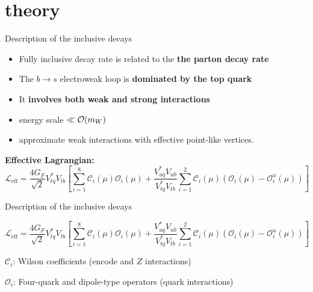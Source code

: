 \documentclass[xcolor=dvipsnames]{beamer}
\begin{document}
\section{\safeBtoXsdgamma theory}

\begin{frame}{Description of the inclusive decays}
   \small

   \begin{itemize}
      \item Fully inclusive decay rate is related to the \textbf{the parton decay rate}
      \item The $b\to s$ electroweak loop is \textbf{dominated by the top quark} 
      \item It \textbf{involves both weak and strong interactions}
      \item[\ra] energy scale $\ll{\ensuremath{\cal O}}(m_W)$
      \item[\ra] approximate weak interactions with effective point-like vertices.
   \end{itemize}

   \textbf{Effective Lagrangian:}
   \begin{equation}\nonumber
      \mathcal{L}_{\mathrm{eff}} = \frac{4G_F}{\sqrt{2}}V_{tq}^*V_{tb}\left[\sum^{8}_{i=1}\mathcal{C}_i(\mu)\mathcal{O}_i(\mu)
                                                  + \frac{V^*_{uq}V_{ub}}{V^*_{tq}V_{tb}}\sum^{2}_{i=1}\mathcal{C}_i(\mu)(\mathcal{O}_i(\mu)-\mathcal{O}_i^u(\mu))\right]
  \end{equation}

\end{frame}


\begin{frame}{Description of the inclusive decays}
   \small

   \begin{equation}\nonumber
      \mathcal{L}_{\mathrm{eff}} = \frac{4G_F}{\sqrt{2}}V_{tq}^*V_{tb}\left[\sum^{8}_{i=1}\mathcal{C}_i(\mu)\mathcal{O}_i(\mu)
                                                  + \frac{V^*_{uq}V_{ub}}{V^*_{tq}V_{tb}}\sum^{2}_{i=1}\mathcal{C}_i(\mu)(\mathcal{O}_i(\mu)-\mathcal{O}_i^u(\mu))\right]
  \end{equation}

  $\mathcal{C}_i$: Wilson coefficients (encode \Wpm and $Z$ interactions)
  
  $\mathcal{O}_i$: Four-quark and dipole-type operators (quark interactions)

\end{frame}
\end{document}
